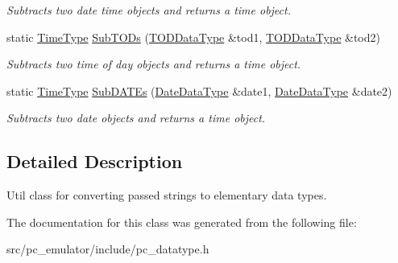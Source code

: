 \begin{DoxyCompactItemize}
\begin{DoxyCompactList}\small\item\em Subtracts two date time objects and returns a time object. \end{DoxyCompactList}\item 
static \hyperlink{structpc__emulator_1_1TIMEDataType}{Time\+Type} \hyperlink{classpc__emulator_1_1DataTypeUtils_a4b694002d5039a511080fa55bea7fd87}{Sub\+T\+O\+Ds} (\hyperlink{structpc__emulator_1_1TODDataType}{T\+O\+D\+Data\+Type} \&tod1, \hyperlink{structpc__emulator_1_1TODDataType}{T\+O\+D\+Data\+Type} \&tod2)\hypertarget{classpc__emulator_1_1DataTypeUtils_a4b694002d5039a511080fa55bea7fd87}{}\label{classpc__emulator_1_1DataTypeUtils_a4b694002d5039a511080fa55bea7fd87}

\begin{DoxyCompactList}\small\item\em Subtracts two time of day objects and returns a time object. \end{DoxyCompactList}\item 
static \hyperlink{structpc__emulator_1_1TIMEDataType}{Time\+Type} \hyperlink{classpc__emulator_1_1DataTypeUtils_ada16478ce0110396b13a04a6edc0bfae}{Sub\+D\+A\+T\+Es} (\hyperlink{structpc__emulator_1_1DateDataType}{Date\+Data\+Type} \&date1, \hyperlink{structpc__emulator_1_1DateDataType}{Date\+Data\+Type} \&date2)\hypertarget{classpc__emulator_1_1DataTypeUtils_ada16478ce0110396b13a04a6edc0bfae}{}\label{classpc__emulator_1_1DataTypeUtils_ada16478ce0110396b13a04a6edc0bfae}

\begin{DoxyCompactList}\small\item\em Subtracts two date objects and returns a time object. \end{DoxyCompactList}\end{DoxyCompactItemize}


\subsection{Detailed Description}
Util class for converting passed strings to elementary data types. 

The documentation for this class was generated from the following file\+:\begin{DoxyCompactItemize}
\item 
src/pc\+\_\+emulator/include/pc\+\_\+datatype.\+h\end{DoxyCompactItemize}
